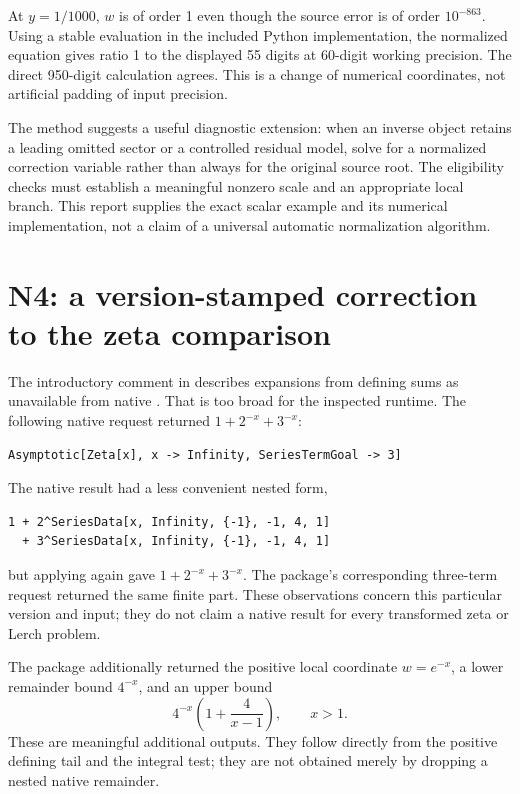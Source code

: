 \documentclass[11pt,letterpaper]{article}
\newcommand{\code}[1]{\texttt{\detokenize{#1}}}
\begin{document}
At $y=1/1000$, $w$ is of order 1 even though the source error is of order
$10^{-863}$. Using a stable \code{expm1} evaluation in the included Python
implementation, the normalized equation gives ratio 1 to the displayed
55 digits at 60-digit working precision. The direct 950-digit calculation
agrees. This is a change of numerical coordinates, not artificial padding of
input precision.

The method suggests a useful diagnostic extension: when an inverse object
retains a leading omitted sector or a controlled residual model, solve for a
normalized correction variable rather than always for the original source
root. The eligibility checks must establish a meaningful nonzero scale and
an appropriate local branch. This report supplies the exact scalar example
and its numerical implementation, not a claim of a universal automatic
normalization algorithm.

\section{N4: a version-stamped correction to the zeta comparison}
\label{sec:n4}
The introductory comment in  describes
expansions from defining sums as unavailable from native \code{Series}.
That is too broad for the inspected runtime. The following native request
returned $1+2^{-x}+3^{-x}$:
\begin{lstlisting}
Asymptotic[Zeta[x], x -> Infinity, SeriesTermGoal -> 3]
\end{lstlisting}
The native \code{Series[Zeta[x], {x, Infinity, 3}]} result had a less convenient
nested form,
\begin{lstlisting}
1 + 2^SeriesData[x, Infinity, {-1}, -1, 4, 1]
  + 3^SeriesData[x, Infinity, {-1}, -1, 4, 1]
\end{lstlisting}
but applying \code{Normal} again gave $1+2^{-x}+3^{-x}$.
The package's corresponding three-term request returned the same finite part.
These observations concern this particular version and input; they do not
claim a native result for every transformed zeta or Lerch problem.
\cite{dirichlet,wlasymptotic,wlseries}

The package additionally returned the positive local coordinate $w=e^{-x}$,
a lower remainder bound $4^{-x}$, and an upper bound
\begin{equation}
 4^{-x}\left(1+\frac4{x-1}\right),\qquad x>1.
 \label{eq:zeta-bound}
\end{equation}
These are meaningful additional outputs. They follow directly from the positive
defining tail and the integral test; they are not obtained merely by dropping
a nested native remainder.
\end{document}
